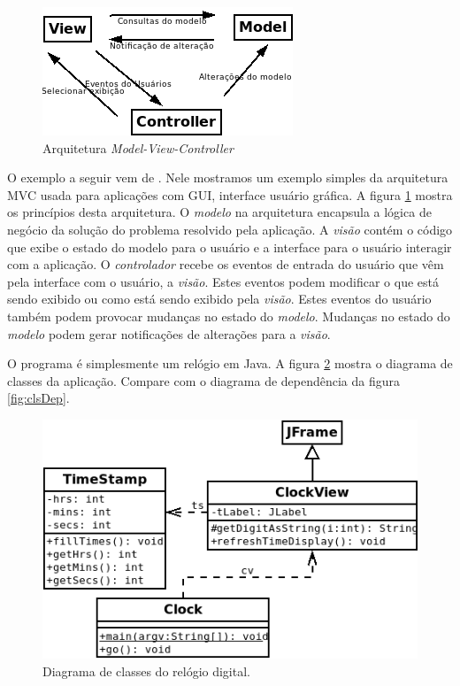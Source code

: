 \documentclass[
	11pt,				%
	openright,
	twoside,			%
	a4paper,			%
	english,			%
	french,
	brazil,				%
	sumario=tradicional
	]{abntex2}
\begin{document}
\begin{figure}[h]
\begin{center}
\includegraphics[scale=0.7]{MVC.png} 
\caption{Arquitetura \emph{Model-View-Controller}} \label{fig:mvc}
\end{center}
\end{figure}

O exemplo a seguir vem de . Nele mostramos um exemplo simples da arquitetura MVC usada para aplicações com GUI, interface usuário gráfica. A figura \ref{fig:mvc} mostra os princípios desta arquitetura. O \emph{modelo} na arquitetura encapsula a lógica de negócio da solução do problema resolvido pela aplicação. A \emph{visão} contém o código que exibe o estado do modelo para o usuário e a interface para o usuário interagir com a aplicação. O \emph{controlador} recebe os eventos de entrada do usuário que vêm pela interface com o usuário, a \emph{visão}. Estes eventos podem modificar o que está sendo exibido ou como está sendo exibido pela \emph{visão}. Estes eventos do usuário também podem provocar mudanças no estado do \emph{modelo}. Mudanças no estado do \emph{modelo} podem gerar notificações de alterações para a \emph{visão}.

O programa é simplesmente um relógio em Java. A figura \ref{fig:clock} mostra o diagrama de classes da aplicação. Compare com o diagrama de dependência da figura \ref{fig:clsDep}.

\begin{figure}[h]
\begin{center}
\includegraphics[scale=0.6]{clock.png} 
\caption{Diagrama de classes do relógio digital.} \label{fig:clock}
\end{center}
\end{figure}
\end{document}
